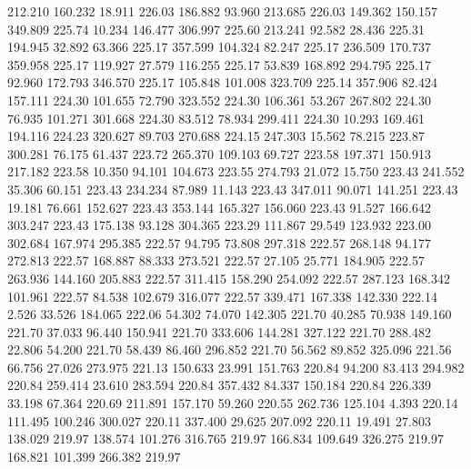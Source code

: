  212.210  160.232   18.911       226.03
 186.882   93.960  213.685       226.03
 149.362  150.157  349.809       225.74
  10.234  146.477  306.997       225.60
 213.241   92.582   28.436       225.31
 194.945   32.892   63.366       225.17
 357.599  104.324   82.247       225.17
 236.509  170.737  359.958       225.17
 119.927   27.579  116.255       225.17
  53.839  168.892  294.795       225.17
  92.960  172.793  346.570       225.17
 105.848  101.008  323.709       225.14
 357.906   82.424  157.111       224.30
 101.655   72.790  323.552       224.30
 106.361   53.267  267.802       224.30
  76.935  101.271  301.668       224.30
  83.512   78.934  299.411       224.30
  10.293  169.461  194.116       224.23
 320.627   89.703  270.688       224.15
 247.303   15.562   78.215       223.87
 300.281   76.175   61.437       223.72
 265.370  109.103   69.727       223.58
 197.371  150.913  217.182       223.58
  10.350   94.101  104.673       223.55
 274.793   21.072   15.750       223.43
 241.552   35.306   60.151       223.43
 234.234   87.989   11.143       223.43
 347.011   90.071  141.251       223.43
  19.181   76.661  152.627       223.43
 353.144  165.327  156.060       223.43
  91.527  166.642  303.247       223.43
 175.138   93.128  304.365       223.29
 111.867   29.549  123.932       223.00
 302.684  167.974  295.385       222.57
  94.795   73.808  297.318       222.57
 268.148   94.177  272.813       222.57
 168.887   88.333  273.521       222.57
  27.105   25.771  184.905       222.57
 263.936  144.160  205.883       222.57
 311.415  158.290  254.092       222.57
 287.123  168.342  101.961       222.57
  84.538  102.679  316.077       222.57
 339.471  167.338  142.330       222.14
   2.526   33.526  184.065       222.06
  54.302   74.070  142.305       221.70
  40.285   70.938  149.160       221.70
  37.033   96.440  150.941       221.70
 333.606  144.281  327.122       221.70
 288.482   22.806   54.200       221.70
  58.439   86.460  296.852       221.70
  56.562   89.852  325.096       221.56
  66.756   27.026  273.975       221.13
 150.633   23.991  151.763       220.84
  94.200   83.413  294.982       220.84
 259.414   23.610  283.594       220.84
 357.432   84.337  150.184       220.84
 226.339   33.198   67.364       220.69
 211.891  157.170   59.260       220.55
 262.736  125.104    4.393       220.14
 111.495  100.246  300.027       220.11
 337.400   29.625  207.092       220.11
  19.491   27.803  138.029       219.97
 138.574  101.276  316.765       219.97
 166.834  109.649  326.275       219.97
 168.821  101.399  266.382       219.97
